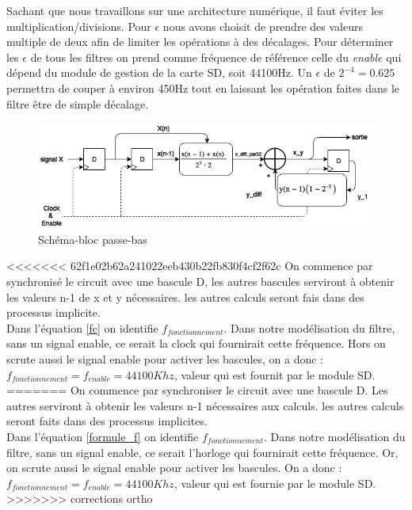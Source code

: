 \documentclass[hidelinks]{article}
\begin{document}
    Sachant que nous travaillons sur une architecture numérique, il faut éviter les multiplication/divisions. Pour $\epsilon$ nous avons choisit de prendre des valeurs multiple de deux afin de limiter les opérations à des décalages.    
    Pour déterminer les $\epsilon$ de tous les filtres on prend comme fréquence de référence celle du \textit{enable} qui dépend du module de gestion de la carte SD, soit 44100Hz. Un $\epsilon$ de $2^{-4}=0.625$ permettra de couper à environ 450Hz tout en laissant les opération faites dans le filtre être de simple décalage.
    \begin{figure}[H]
    	\centering
    	 		\includegraphics[width=12cm,
    	 		keepaspectratio=true]{filtre_passe_bas.png}
    	\caption{\label{passe_bas}Schéma-bloc passe-bas}
    \end{figure}
<<<<<<< 62f1e02b62a241022eeb430b22fb830f4cf2f62c
   	On commence par synchronisé le circuit avec une bascule D, les autres bascules serviront à obtenir les valeurs n-1 de x et y nécessaires. les autres calculs seront fais dans des processus implicite.\\
   	Dans l'équation \ref{fc} on identifie $f_{fonctionnement}$. Dans notre modélisation du filtre, sans un signal enable, ce serait la clock qui fournirait cette fréquence. Hors on scrute aussi le signal enable pour activer les bascules, on a donc :\\$f_{fonctionnement}=f_{enable}=44100Khz$, valeur qui est fournit par le module SD.
=======
   	On commence par synchroniser le circuit avec une bascule D. Les autres serviront à obtenir les valeurs n-1 nécessaires aux calculs. les autres calculs seront faits dans des processus implicites.\\ %
   	
   	Dans l'équation \ref{formule_f} on identifie $f_{fonctionnement}$. Dans notre modélisation du filtre, sans un signal enable, ce serait l'horloge qui fournirait cette fréquence. Or, on scrute aussi le signal enable pour activer les bascules. On a donc :\\$f_{fonctionnement}=f_{enable}=44100Khz$, valeur qui est fournie par le module SD.
>>>>>>> corrections ortho
   	
\end{document}
